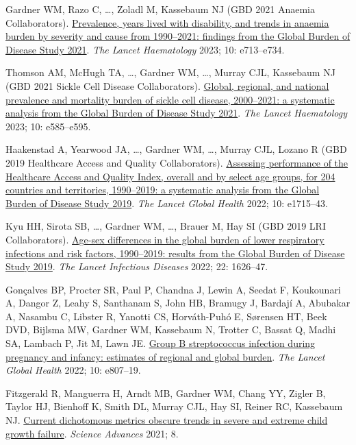 \documentclass[11pt,article,oneside]{memoir}
\begin{document}
\begin{publist}
\item {\minbold Gardner WM}, Razo C, \ldots, Zoladl M, Kassebaum NJ (GBD 2021 Anaemia Collaborators). \href{https://doi.org/10.1016/S2352-3026(23)00160-6}{Prevalence, years lived with disability, and trends in anaemia burden by severity and cause from 1990--2021: findings from the Global Burden of Disease Study 2021}. \emph{The Lancet Haematology} 2023; 10: e713--e734.

\item Thomson AM, McHugh TA, \ldots, {\minbold Gardner WM}, \ldots, Murray CJL, Kassebaum NJ (GBD 2021 Sickle Cell Disease Collaborators). \href{https://doi.org/10.1016/S2352-3026(23)00118-7}{Global, regional, and national prevalence and mortality burden of sickle cell disease, 2000--2021: a systematic analysis from the Global Burden of Disease Study 2021}. \emph{The Lancet Haematology} 2023; 10: e585--e595.

\item Haakenstad A, Yearwood JA, \ldots, {\minbold Gardner WM}, \ldots, Murray CJL, Lozano R (GBD 2019 Healthcare Access and Quality Collaborators). \href{https://doi.org/10.1016/S2214-109X(22)00429-6}{Assessing performance of the Healthcare Access and Quality Index, overall and by select age groups, for 204 countries and territories, 1990--2019: a systematic analysis from the Global Burden of Disease Study 2019}. \emph{The Lancet Global Health} 2022; 10: e1715--43.

\item Kyu HH, Sirota SB, \ldots, {\minbold Gardner WM}, \ldots, Brauer M, Hay SI (GBD 2019 LRI Collaborators). \href{https://doi.org/10.1016/S1473-3099(22)00510-2}{Age-sex differences in the global burden of lower respiratory infections and risk factors, 1990--2019: results from the Global Burden of Disease Study 2019}. \emph{The Lancet Infectious Diseases} 2022; 22: 1626--47.

\item Gonçalves BP, Procter SR, Paul P, Chandna J, Lewin A, Seedat F, Koukounari A, Dangor Z, Leahy S, Santhanam S, John HB, Bramugy J, Bardají A, Abubakar A, Nasambu C, Libster R, Yanotti CS, Horváth-Puhó E, Sørensen HT, Beek DVD, Bijlsma MW, {\minbold Gardner WM}, Kassebaum N, Trotter C, Bassat Q, Madhi SA, Lambach P, Jit M, Lawn JE. \href{https://doi.org/10.1016/S2214-109X(22)00093-6}{Group B streptococcus infection during pregnancy and infancy: estimates of regional and global burden}. \emph{The Lancet Global Health} 2022; 10: e807--19.

\item Fitzgerald R, Manguerra H, Arndt MB, {\minbold Gardner WM}, Chang YY, Zigler B, Taylor HJ, Bienhoff K, Smith DL, Murray CJL, Hay SI, Reiner RC, Kassebaum NJ. \href{https://doi.org/10.1126/sciadv.abm8954}{Current dichotomous metrics obscure trends in severe and extreme child growth failure}. \emph{Science Advances} 2021; 8.


\end{publist}
\end{document}
